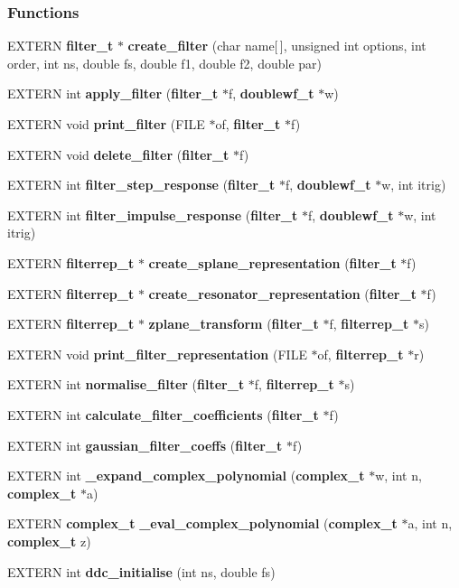 \subsubsection*{Functions}
\begin{CompactItemize}
\item 
EXTERN {\bf filter\_\-t} $\ast$ {\bf create\_\-filter} (char name[$\,$], unsigned int options, int order, int ns, double fs, double f1, double f2, double par)
\item 
EXTERN int {\bf apply\_\-filter} ({\bf filter\_\-t} $\ast$f, {\bf doublewf\_\-t} $\ast$w)
\item 
EXTERN void {\bf print\_\-filter} (FILE $\ast$of, {\bf filter\_\-t} $\ast$f)
\item 
EXTERN void {\bf delete\_\-filter} ({\bf filter\_\-t} $\ast$f)
\item 
EXTERN int {\bf filter\_\-step\_\-response} ({\bf filter\_\-t} $\ast$f, {\bf doublewf\_\-t} $\ast$w, int itrig)
\item 
EXTERN int {\bf filter\_\-impulse\_\-response} ({\bf filter\_\-t} $\ast$f, {\bf doublewf\_\-t} $\ast$w, int itrig)
\item 
EXTERN {\bf filterrep\_\-t} $\ast$ {\bf create\_\-splane\_\-representation} ({\bf filter\_\-t} $\ast$f)
\item 
EXTERN {\bf filterrep\_\-t} $\ast$ {\bf create\_\-resonator\_\-representation} ({\bf filter\_\-t} $\ast$f)
\item 
EXTERN {\bf filterrep\_\-t} $\ast$ {\bf zplane\_\-transform} ({\bf filter\_\-t} $\ast$f, {\bf filterrep\_\-t} $\ast$s)
\item 
EXTERN void {\bf print\_\-filter\_\-representation} (FILE $\ast$of, {\bf filterrep\_\-t} $\ast$r)
\item 
EXTERN int {\bf normalise\_\-filter} ({\bf filter\_\-t} $\ast$f, {\bf filterrep\_\-t} $\ast$s)
\item 
EXTERN int {\bf calculate\_\-filter\_\-coefficients} ({\bf filter\_\-t} $\ast$f)
\item 
EXTERN int {\bf gaussian\_\-filter\_\-coeffs} ({\bf filter\_\-t} $\ast$f)
\item 
EXTERN int {\bf \_\-expand\_\-complex\_\-polynomial} ({\bf complex\_\-t} $\ast$w, int n, {\bf complex\_\-t} $\ast$a)
\item 
EXTERN {\bf complex\_\-t} {\bf \_\-eval\_\-complex\_\-polynomial} ({\bf complex\_\-t} $\ast$a, int n, {\bf complex\_\-t} z)
\item 
EXTERN int {\bf ddc\_\-initialise} (int ns, double fs)
\item 

\end{CompactItemize}
